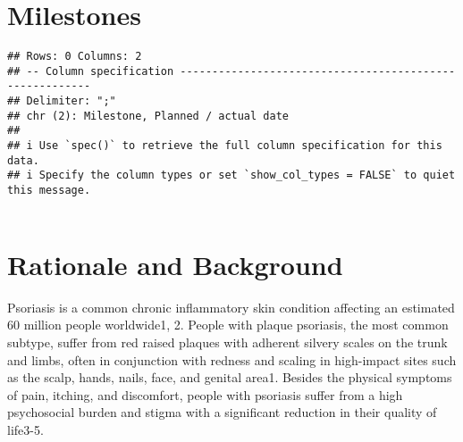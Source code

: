 \documentclass[
  12pt,
]{article}
\begin{document}
\begin{table}[!h]
\centering\begingroup\fontsize{8}{10}\selectfont

\begin{tabular}{lllll}
\toprule
\cellcolor{gray!6}{Number} & \cellcolor{gray!6}{Date} & \cellcolor{gray!6}{Section of study protocol} & \cellcolor{gray!6}{Amendment or update} & \cellcolor{gray!6}{Reason}\\


\bottomrule
\end{tabular}
\endgroup{}
\end{table}

\hypertarget{milestones}{%
\section{Milestones}\label{milestones}}

\begin{verbatim}
## Rows: 0 Columns: 2
## -- Column specification --------------------------------------------------------
## Delimiter: ";"
## chr (2): Milestone, Planned / actual date
## 
## i Use `spec()` to retrieve the full column specification for this data.
## i Specify the column types or set `show_col_types = FALSE` to quiet this message.
\end{verbatim}

\begin{table}[!h]
\centering\begingroup\fontsize{8}{10}\selectfont

\begin{tabular}{ll}
\toprule
\cellcolor{gray!6}{Milestone} & \cellcolor{gray!6}{Planned / actual date}\\


\bottomrule
\end{tabular}
\endgroup{}
\end{table}

\hypertarget{rationale-and-background}{%
\section{Rationale and Background}\label{rationale-and-background}}

Psoriasis is a common chronic inflammatory skin condition affecting an estimated 60 million people worldwide1, 2. People with plaque psoriasis, the most common subtype, suffer from red raised plaques with adherent silvery scales on the trunk and limbs, often in conjunction with redness and scaling in high-impact sites such as the scalp, hands, nails, face, and genital area1. Besides the physical symptoms of pain, itching, and discomfort, people with psoriasis suffer from a high psychosocial burden and stigma with a significant reduction in their quality of life3-5.
\end{document}

